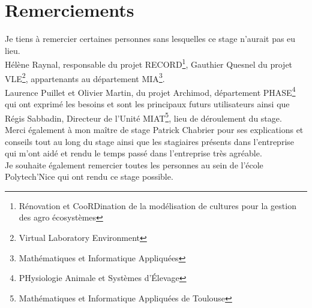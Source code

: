 \chapter*{Remerciements}
\setlength{\parskip}{2.5ex plus .4ex minus .4ex}
\setcounter{page}{2} 
Je tiens à remercier certaines personnes sans lesquelles ce stage n'aurait pas eu lieu.\\
Hélène Raynal, responsable du projet RECORD\footnote{Rénovation et CooRDination de la modélisation de cultures pour la gestion des agro écosystèmes}, Gauthier Quesnel du projet VLE\footnote{Virtual Laboratory Environment}, appartenants au département MIA\footnote{Mathématiques et Informatique Appliquées}.\\
Laurence Puillet et Olivier Martin, du projet Archimod, département PHASE\footnote{PHysiologie Animale et Systèmes d’Élevage} qui ont exprimé les besoins et sont les principaux futurs utilisateurs ainsi que Régis Sabbadin, Directeur de l'Unité MIAT\footnote{Mathématiques et Informatique Appliquées de Toulouse}, lieu de déroulement du stage.\\

Merci également à mon maître de stage Patrick Chabrier pour ses explications et conseils tout au long du stage ainsi que les stagiaires présents dans l'entreprise qui m'ont aidé et rendu le temps passé dans l'entreprise très agréable.\\

Je souhaite également remercier toutes les personnes au sein de l'école Polytech'Nice qui ont rendu ce stage possible.